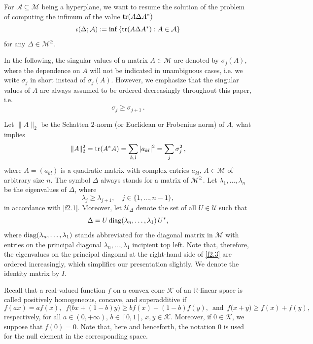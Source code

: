 \documentclass{amsart}
\begin{document}
For ${\mathcal A} \subseteq {\mathcal M}$ being a hyperplane, we want to resume the solution of the problem of computing the infimum of the value  ${\rm tr}(A \Delta A^*)$
\begin{equation} \label{f2.0}
    \iota(\Delta;{\mathcal A}) := \inf \left \{ {\rm tr}( A \Delta A^*) :  A\in {\mathcal A} \right \}
\end{equation} 
for any $\Delta\in {\mathcal M}^{\geq}$. 

In the following, the singular values of a matrix $A \in {\mathcal M}$ are denoted by $\sigma_j(A)$, where the dependence on $A$ will not be indicated in unambiguous cases, i.e. we write $\sigma_j$ in short instead of $\sigma_j(A)$. However, we emphasize that the singular values of $A$ are always assumed to be ordered decreasingly throughout this paper, i.e.
\begin{equation} \label{f2.1}
  \sigma_j \geq \sigma_{j+1} \, .
\end{equation}

Let $\|A\|_2$ be the Schatten $2$-norm (or Euclidean or Frobenius norm) of $A$, what
implies
\[ 
    \|A\|_2 ^2= {\rm tr}(A^* A) = \sum_{k,l} |a_{k l}|^2 = \sum_{j} \sigma_j^2 \, ,  
\]
where $A=(a_{k l})$ is a quadratic matrix with complex entries $a_{k l}$, $A \in {\mathcal M}$ of arbitrary size $n$. The symbol $\Delta$ always stands for a matrix of ${\mathcal M}^{\geq}$.  Let $\lambda_1,\ldots,\lambda_n$ be the eigenvalues of $\Delta$, where
\[ 
    \lambda_j \geq \lambda_{j+1}, \quad j\in\{1,\ldots,n-1\},  
\]
in accordance with \eqref{f2.1}. Moreover, let ${\mathcal U}_{\Delta}$ denote the set of all $U\in {\mathcal U}$ such that
\begin{equation} \label{f2.3}
  \Delta = U \, {\rm diag}(\lambda_n,\ldots,\lambda_1) \, U^*,
\end{equation}
where ${\rm diag}(\lambda_n,\ldots,\lambda_1)$ stands abbreviated for the diagonal matrix in $\mathcal M$ with entries on the principal diagonal $\lambda_n,\ldots,\lambda_1$ incipient top left. %
Note that, therefore, the eigenvalues on the principal diagonal at the right-hand side of \eqref{f2.3} are ordered increasingly, which simplifies our presentation slightly. We denote the identity matrix by $I$.

Recall that a real-valued function $f$ on a convex cone $\mathcal K$ of an $\mathbb R$-linear space is called positively homogeneous, concave, and superadditive if
\[ 
   f(ax) = af(x),\,\,\,
   f\bigl(bx+(1-b)y\bigr) \geq bf(x)+(1-b)f(y),\,\,\, \mbox{and}\,\,\,
   f(x+y\bigr) \geq f(x)+f(y), 
\]
respectively, for all $a\in (0,+\infty)$, $b\in[0,1]$, $x,y\in {\mathcal K}$.
Moreover, if $0\in {\mathcal K}$, we suppose that $f(0)=0$. Note that, here and henceforth, the notation $0$ is used for the null element in the corresponding space.
\end{document}
